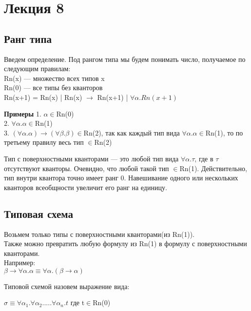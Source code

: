 \section{Лекция 8}
	\subsection{Ранг типа}
	\begin{definition}
		 Введем определение. Под {рангом типа} мы будем понимать число, получаемое по следующим правилам: \\
	    Rn(x) --- множество всех типов x\\
	    Rn(0) --- все типы без кванторов\\
	    Rn(x+1) = Rn(x) | Rn(x) $\rightarrow$ Rn(x+1) | $\forall\alpha.Rn(x+1)$
	\end{definition}
	 
	\textbf{Примеры}
	 1. $ \alpha\in $Rn(0) \\
	 2. $ \forall\alpha.\alpha \in$Rn(1)\\
	 3. $ (\forall\alpha.\alpha)\rightarrow(\forall\beta.\beta) \in$Rn(2), так как каждый тип вида $ \forall\alpha.\alpha \in$Rn(1), то по третьему правилу весь тип $ \in $Rn(2) \\

	\begin{definition}
		Тип с поверхностными кванторами --- это любой тип вида $ \forall\alpha.\tau $, где в $ \tau $ отсутствуют кванторы. Очевидно, что любой такой тип $ \in $Rn(1). Действительно, тип внутри квантора точно имеет ранг 0. Навешивание одного или нескольких кванторов всеобщности увеличит его ранг на единицу.
	\end{definition}
	 
	 \subsection{Типовая схема}
	 Возьмем только типы с поверхностными кванторами(из Rn(1)). \\
	 Также можно превратить любую формулу из Rn(1) в формулу с поверхностными кванторами. \\
	 Например:\\ 
	 $ \beta\rightarrow\forall\alpha.\alpha\equiv\forall\alpha.(\beta\rightarrow\alpha) $
	 \\
	 
	 \begin{definition}
	 	{Типовой схемой} назовем выражение вида: 

\begin{center}
		 $ \sigma\equiv\forall\alpha_1.\forall\alpha_2.....\forall\alpha_n.t $ где t$ \in $Rn(0)
\end{center}
	 	 \end{definition}
 	 
